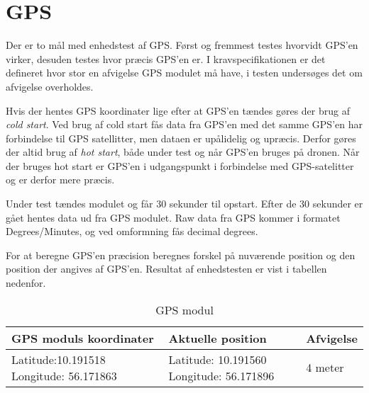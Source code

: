 \section{GPS}

Der er to mål med enhedstest af GPS. Først og fremmest testes hvorvidt GPS'en virker, desuden testes hvor præcis GPS'en er. I kravspecifikationen er det defineret hvor stor en afvigelse GPS modulet må have, i testen undersøges det om afvigelse overholdes. 

Hvis der hentes GPS koordinater lige efter at GPS'en tændes gøres der brug af \textit{cold start}. Ved brug af cold start fås data fra GPS'en med det samme GPS'en har forbindelse til GPS satellitter, men dataen er upålidelig og upræcis. Derfor gøres der altid brug af \textit{hot start}, både under test og når GPS'en bruges på dronen. Når der bruges hot start er GPS'en i udgangspunkt i forbindelse med GPS-satelitter og er derfor mere præcis. 

Under test tændes modulet og får 30 sekunder til opstart. Efter de 30 sekunder er gået hentes data ud fra GPS modulet. Raw data fra GPS kommer i formatet Degrees/Minutes, og ved omformning fås decimal degrees.

For at beregne GPS'en præcision beregnes forskel på nuværende position og den position der angives af GPS'en. Resultat af enhedstesten er vist i tabellen nedenfor. 


\begin{table}[H]
\begin{tabular}{| p{5.3cm}| p{5.3cm}| p{3cm}|}
\hline
\textbf{GPS moduls koordinater} & \textbf{Aktuelle position} & \textbf{Afvigelse}\\\hline
Latitude:10.191518 \newline Longitude: 56.171863 & Latitude: 10.191560 \newline Longitude: 56.171896 & 4 meter\\\hline

\end{tabular}
\caption{GPS modul}
\label{tab:GPS_modul}
\end{table}

